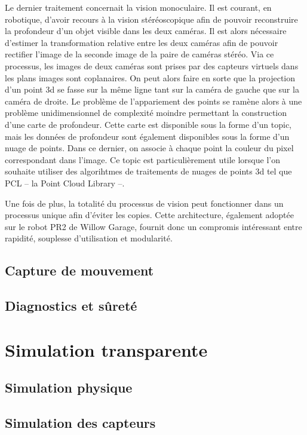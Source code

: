 Le dernier traitement concernait la vision monoculaire. Il est
courant, en robotique, d'avoir recours à la vision stéréoscopique afin
de pouvoir reconstruire la profondeur d'un objet visible dans les deux
caméras. Il est alors nécessaire d'estimer la transformation relative
entre les deux caméras afin de pouvoir rectifier l'image de la seconde
image de la paire de caméras stéréo. Via ce processus, les images de
deux caméras sont prises par des capteurs virtuels dans les plans
images sont coplanaires. On peut alors faire en sorte que la
projection d'un point 3d se fasse sur la même ligne tant sur la caméra
de gauche que sur la caméra de droite. Le problème de l'appariement
des points se ramène alors à une problème unidimensionnel de
complexité moindre permettant la construction d'une carte de
profondeur. Cette carte est disponible sous la forme d'un topic, mais
les données de profondeur sont également disponibles sous la forme
d'un nuage de points. Dans ce dernier, on associe à chaque point la
couleur du pixel correspondant dans l'image. Ce topic est
particulièrement utile lorsque l'on souhaite utiliser des algorihtmes
de traitements de nuages de points 3d tel que PCL -- la Point Cloud
Library --.


Une fois de plus, la totalité du processus de vision peut fonctionner
dans un processus unique afin d'éviter les copies. Cette architecture,
également adoptée sur le robot PR2 de Willow Garage, fournit donc un
compromis intéressant entre rapidité, souplesse d'utilisation et
modularité.


\subsection{Capture de mouvement}
\subsection{Diagnostics et sûreté}

\section{Simulation transparente}
\subsection{Simulation physique}
\subsection{Simulation des capteurs}

